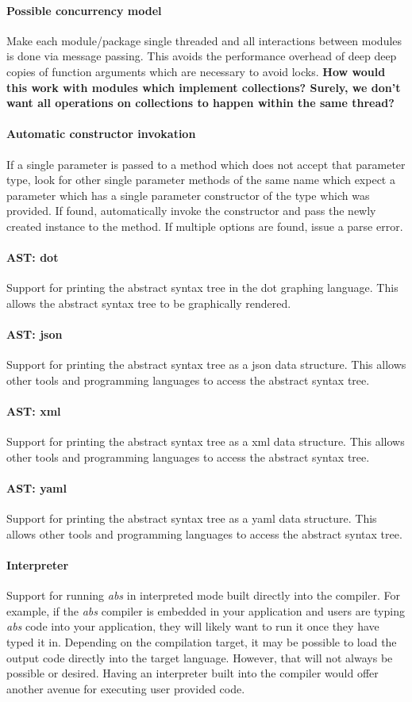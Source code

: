 \documentclass[hidelinks]{article}
\begin{document}
\paragraph{Possible concurrency model} Make each module/package single threaded and all interactions between modules is done via message passing. This avoids the performance overhead of deep deep copies of function arguments which are necessary to avoid locks. \textbf{How would this work with modules which implement collections? Surely, we don't want all operations on collections to happen within the same thread?}
\paragraph{Automatic constructor invokation} If a single parameter is passed to a method which does not accept that parameter type, look for other single parameter methods of the same name which expect a parameter which has a single parameter constructor of the type which was provided. If found, automatically invoke the constructor and pass the newly created instance to the method. If multiple options are found, issue a parse error.
\paragraph{AST: dot} Support for printing the abstract syntax tree in the dot graphing language. This allows the abstract syntax tree to be graphically rendered.
\paragraph{AST: json} Support for printing the abstract syntax tree as a json data structure. This allows other tools and programming languages to access the abstract syntax tree.
\paragraph{AST: xml} Support for printing the abstract syntax tree as a xml data structure. This allows other tools and programming languages to access the abstract syntax tree.
\paragraph{AST: yaml} Support for printing the abstract syntax tree as a yaml data structure. This allows other tools and programming languages to access the abstract syntax tree.
\paragraph{Interpreter} Support for running \textit{abs} in interpreted mode built directly into the compiler. For example, if the \textit{abs} compiler is embedded in your application and users are typing \textit{abs} code into your application, they will likely want to run it once they have typed it in. Depending on the compilation target, it may be possible to load the output code directly into the target language. However, that will not always be possible or desired. Having an interpreter built into the compiler would offer another avenue for executing user provided code.
\end{document}
